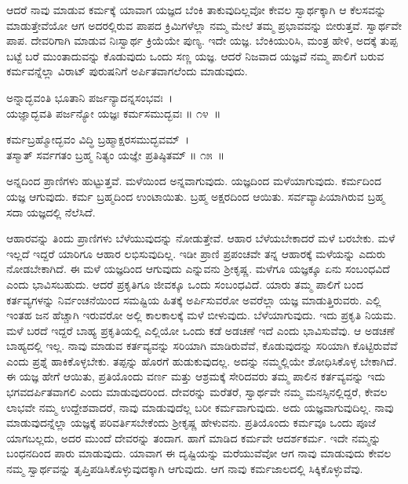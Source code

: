 ಆದರೆ ನಾವು ಮಾಡುವ ಕರ್ಮಕ್ಕೆ ಯಾವಾಗ ಯಜ್ಞದ ಬೆಂಕಿ ತಾಕುವುದಿಲ್ಲವೋ ಕೇವಲ ಸ್ವಾರ್ಥಕ್ಕಾಗಿ ಆ ಕೆಲಸವನ್ನು ಮಾಡುತ್ತೇವೆಯೋ ಆಗ ಅದರಲ್ಲಿರುವ ಪಾಪದ ಕ್ರಿಮಿಗಳೆಲ್ಲಾ ನಮ್ಮ ಮೇಲೆ ತಮ್ಮ ಪ್ರಭಾವವನ್ನು ಬೀರುತ್ತವೆ. ಸ್ವಾರ್ಥವೇ ಪಾಪ. ದೇವರಿಗಾಗಿ ಮಾಡುವ ನಿಃಸ್ವಾರ್ಥ ಕ್ರಿಯೆಯೇ ಪುಣ್ಯ. ಇದೇ ಯಜ್ಞ. ಬೆಂಕಿಯುರಿಸಿ, ಮಂತ್ರ ಹೇಳಿ, ಅದಕ್ಕೆ ತುಪ್ಪ ಬಟ್ಟೆ ಬರೆ ಮುಂತಾದುವನ್ನು ಕೊಡುವುದು ಒಂದು ಸಣ್ಣ ಯಜ್ಞ. ಆದರೆ ನಿಜವಾದ ಯಜ್ಞವೆ ನಮ್ಮ ಪಾಲಿಗೆ ಬರುವ ಕರ್ಮವನ್ನೆಲ್ಲಾ ವಿರಾಟ್ ಪುರುಷನಿಗೆ ಅರ್ಪಿತವಾಗಲೆಂದು ಮಾಡುವುದು.

\begin{shloka}
ಅನ್ನಾದ್ಭವಂತಿ ಭೂತಾನಿ ಪರ್ಜನ್ಯಾದನ್ನಸಂಭವಃ~।\\ಯಜ್ಞಾದ್ಭವತಿ ಪರ್ಜನ್ಯೋ ಯಜ್ಞಃ ಕರ್ಮಸಮುದ್ಭವಃ \hfill॥ ೧೪~॥
\end{shloka}

\begin{shloka}
ಕರ್ಮಬ್ರಹ್ಮೋದ್ಭವಂ ವಿದ್ಧಿ ಬ್ರಹ್ಮಾಕ್ಷರಸಮುದ್ಭವಮ್~।\\ತಸ್ಮಾತ್ ಸರ್ವಗತಂ ಬ್ರಹ್ಮ ನಿತ್ಯಂ ಯಜ್ಞೇ ಪ್ರತಿಷ್ಠಿತಮ್ \hfill॥ ೧೫~॥
\end{shloka}

\begin{artha}
ಅನ್ನದಿಂದ ಪ್ರಾಣಿಗಳು ಹುಟ್ಟುತ್ತವೆ. ಮಳೆಯಿಂದ ಅನ್ನವಾಗುವುದು. ಯಜ್ಞದಿಂದ ಮಳೆಯಾಗುವುದು. ಕರ್ಮದಿಂದ ಯಜ್ಞ ಆಗುವುದು. ಕರ್ಮ ಬ್ರಹ್ಮದಿಂದ ಉಂಟಾಯಿತು. ಬ್ರಹ್ಮ ಅಕ್ಷರದಿಂದ ಆಯಿತು. ಸರ್ವವ್ಯಾಪಿಯಾಗಿರುವ ಬ್ರಹ್ಮ ಸದಾ ಯಜ್ಞದಲ್ಲಿ ನೆಲೆಸಿದೆ.
\end{artha}

ಆಹಾರವನ್ನು ತಿಂದು ಪ್ರಾಣಿಗಳು ಬೆಳೆಯುವುದನ್ನು ನೋಡುತ್ತೇವೆ. ಆಹಾರ ಬೆಳೆಯ\-ಬೇಕಾದರೆ ಮಳೆ ಬರಬೇಕು. ಮಳೆ ಇಲ್ಲದೆ ಇದ್ದರೆ ಯಾರಿಗೂ ಆಹಾರ ಲಭಿಸುವುದಿಲ್ಲ. ಇಡೀ ಪ್ರಾಣಿ ಪ್ರಪಂಚವೇ ತನ್ನ ಆಹಾರಕ್ಕೆ ಮಳೆಯನ್ನು ಎದುರು ನೋಡಬೇಕಾಗಿದೆ. ಈ ಮಳೆ ಯಜ್ಞದಿಂದ ಆಗುವುದು ಎನ್ನುವನು ಶ‍್ರೀಕೃಷ್ಣ. ಮಳೆಗೂ ಯಜ್ಞಕ್ಕೂ ಏನು ಸಂಬಂಧವಿದೆ ಎಂದು ಭಾವಿಸಬಹುದು. ಆದರೆ ಪ್ರಕೃತಿಗೂ ಜೀವಕ್ಕೂ ಒಂದು ಸಂಬಂಧವಿದೆ. ಯಾರು ತಮ್ಮ ಪಾಲಿಗೆ ಬಂದ ಕರ್ತವ್ಯಗಳನ್ನು ನಿರ್ವಂಚನೆಯಿಂದ ಸಮಷ್ಟಿಯ ಹಿತಕ್ಕೆ ಅರ್ಪಿಸುವರೋ ಅವರೆಲ್ಲಾ ಯಜ್ಞ ಮಾಡುತ್ತಿರುವರು. ಎಲ್ಲಿ ಇಂತಹ ಜನ ಹೆಚ್ಚಾಗಿ ಇರುವರೋ ಅಲ್ಲಿ ಕಾಲಕಾಲಕ್ಕೆ ಮಳೆ ಬೀಳುವುದು. ಬೆಳೆಯಾಗುವುದು. ಇದು ಪ್ರಕೃತಿ ನಿಯಮ. ಮಳೆ ಬರದೆ ಇದ್ದರೆ ಬಾಹ್ಯ ಪ್ರಕೃತಿಯಲ್ಲಿ ಎಲ್ಲಿಯೋ ಒಂದು ಕಡೆ ಅಡಚಣೆ ಇದೆ ಎಂದು ಭಾವಿಸುವೆವು. ಆ ಅಡಚಣೆ ಬಾಹ್ಯದಲ್ಲಿ ಇಲ್ಲ. ನಾವು ಮಾಡುವ ಕರ್ತವ್ಯವನ್ನು ಸರಿಯಾಗಿ ಮಾಡಿರುವೆವೆ, ಕೊಡುವುದನ್ನು ಸರಿಯಾಗಿ ಕೊಟ್ಟಿರುವೆವೆ ಎಂದು ಪ್ರಶ್ನೆ ಹಾಕಿಕೊಳ್ಳಬೇಕು. ತಪ್ಪನ್ನು ಹೊರಗೆ ಹುಡುಕುವುದಲ್ಲ. ಅದನ್ನು ನಮ್ಮಲ್ಲಿಯೇ ಶೋಧಿಸಿಕೊಳ್ಳ ಬೇಕಾಗಿದೆ. ಈ ಯಜ್ಞ ಹೇಗೆ ಆಯಿತು, ಪ್ರತಿಯೊಂದು ವರ್ಣ ಮತ್ತು ಆಶ್ರಮಕ್ಕೆ ಸೇರಿದವರು ತಮ್ಮ ಪಾಲಿನ ಕರ್ತವ್ಯವನ್ನು ಇದು ಭಗವದರ್ಪಿತವಾಗಲಿ ಎಂದು ಮಾಡುವುದರಿಂದ. ದೇವರನ್ನು ಮರೆತರೆ, ಸ್ವಾರ್ಥವೇ ನಮ್ಮ ಮನಸ್ಸಿನಲ್ಲಿದ್ದರೆ, ಕೇವಲ ಲಾಭವೇ ನಮ್ಮ ಉದ್ದೇಶವಾದರೆ, ನಾವು ಮಾಡುವುದೆಲ್ಲ ಬರೀ ಕರ್ಮವಾಗುವುದು. ಅದು ಯಜ್ಞವಾಗುವುದಿಲ್ಲ. ನಾವು ಮಾಡುವುದನ್ನೆಲ್ಲಾ ಯಜ್ಞಕ್ಕೆ ಪರಿವರ್ತಿಸಬೇಕೆಂದು ಶ‍್ರೀಕೃಷ್ಣ ಹೇಳುವನು. ಪ್ರತಿಯೊಂದು ಕರ್ಮವೂ ಒಂದು ಪೂಜೆ ಯಾಗಬಲ್ಲದು, ಅದರ ಮುಂದೆ ದೇವರನ್ನು ತಂದಾಗ. ಹಾಗೆ ಮಾಡಿದ ಕರ್ಮವೇ ಆದರ್ಶಕರ್ಮ. ಇದೇ ನಮ್ಮನ್ನು ಬಂಧನದಿಂದ ಪಾರು ಮಾಡುವುದು. ಯಾವಾಗ ಈ ದೃಷ್ಟಿಯನ್ನು ಮರೆಯುವೆವೋ ಆಗ ನಾವು ಮಾಡುವುದು ಕೇವಲ ನಮ್ಮ ಸ್ವಾರ್ಥವನ್ನು ತೃಪ್ತಿಪಡಿಸಿಕೊಳ್ಳುವುದಕ್ಕಾಗಿ ಆಗುವುದು. ಆಗ ನಾವು ಕರ್ಮಜಾಲದಲ್ಲಿ ಸಿಕ್ಕಿಕೊಳ್ಳುವೆವು.

